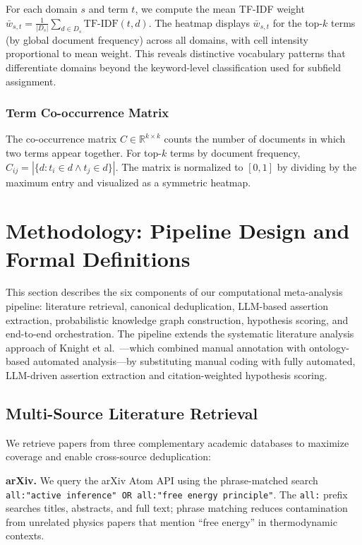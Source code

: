 \documentclass[
]{article}
\begin{document}
For each domain \(s\) and term \(t\), we compute the mean TF-IDF weight
\(\bar{w}_{s,t} = \frac{1}{|D_s|} \sum_{d \in D_s} \text{TF-IDF}(t, d)\).
The heatmap displays \(\bar{w}_{s,t}\) for the top-\(k\) terms (by
global document frequency) across all domains, with cell intensity
proportional to mean weight. This reveals distinctive vocabulary
patterns that differentiate domains beyond the keyword-level
classification used for subfield assignment.

\subsubsection{Term Co-occurrence
Matrix}\label{term-co-occurrence-matrix}

The co-occurrence matrix \(C \in \mathbb{R}^{k \times k}\) counts the
number of documents in which two terms appear together. For top-\(k\)
terms by document frequency,
\(C_{ij} = |\{d : t_i \in d \land t_j \in d\}|\). The matrix is
normalized to \([0, 1]\) by dividing by the maximum entry and visualized
as a symmetric heatmap.

\newpage

\section{Methodology: Pipeline Design and Formal
Definitions}\label{methodology-pipeline-design-and-formal-definitions}

This section describes the six components of our computational
meta-analysis pipeline: literature retrieval, canonical deduplication,
LLM-based assertion extraction, probabilistic knowledge graph
construction, hypothesis scoring, and end-to-end orchestration. The
pipeline extends the systematic literature analysis approach of Knight
et al.~\citep{knight2022fep}---which combined manual annotation with
ontology-based automated analysis---by substituting manual coding with
fully automated, LLM-driven assertion extraction and citation-weighted
hypothesis scoring.

\subsection{Multi-Source Literature
Retrieval}\label{multi-source-literature-retrieval}

We retrieve papers from three complementary academic databases to
maximize coverage and enable cross-source deduplication:

\textbf{arXiv.} We query the arXiv Atom API using the phrase-matched
search
\texttt{all:"active\ inference"\ OR\ all:"free\ energy\ principle"}. The
\texttt{all:} prefix searches titles, abstracts, and full text; phrase
matching reduces contamination from unrelated physics papers that
mention ``free energy'' in thermodynamic contexts.
\end{document}
